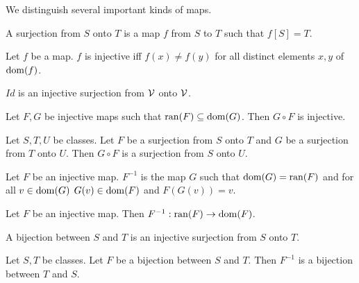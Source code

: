 \documentclass{article}
\newcommand{\range}{\operatorname{ran}}
\newcommand{\inv}[1]{#1^{-1}}
\begin{document}
We distinguish several important kinds of maps.
%
\begin{forthel}
\begin{definition}
A surjection from $S$
onto $T$ is a map $f$ from $S$ to $T$ such that $f[S] = T$.
\end{definition}

\begin{definition}
Let $f$ be a map. $f$ is injective iff $f(x) \neq f(y)$ for all
distinct elements $x,y$ of $\operatorname{dom}(f)$.
\end{definition}

\begin{lemma}
$Id$ is an injective surjection from ${\cal V}$ onto ${\cal V}$.
\end{lemma}

\begin{lemma}
Let $F,G$ be injective maps such that $\range(F) \subseteq \dom(G)$.
Then $G \circ F$ is injective.
\end{lemma}

\begin{lemma} Let $S,T,U$ be classes. Let
$F$ be a surjection from $S$ onto $T$ and $G$ be
a surjection from $T$ onto $U$. Then
$G \circ F$ is a surjection from $S$ onto $U$.
\end{lemma}

\begin{signature}
Let $F$ be an injective map.
$\inv{F}$ is the map $G$ such that $\dom(G) = \range(F)$
and for all $v \in \operatorname{dom}(G)$ $G(v) \in \operatorname{dom}(F)$ and $F(G(v))=v$.
\end{signature}

\begin{lemma}
Let $F$ be an injective map. Then
$\inv{F} : \range(F) \rightarrow \dom(F)$.
\end{lemma}


\begin{definition}
A bijection between $S$ and $T$ is an injective surjection from
$S$ onto $T$.
\end{definition}

\begin{lemma} Let $S, T$ be classes.
Let $F$ be a bijection between $S$ and $T$.
Then $\inv{F}$ is a bijection between $T$ and $S$.
\end{lemma}
\end{forthel}
%
\end{document}
